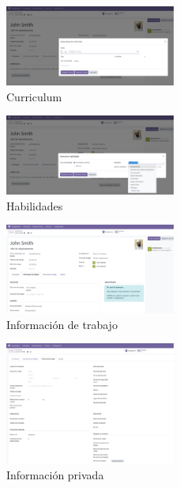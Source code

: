 \documentclass[a4paper,12pt]{article}
\begin{document}
\begin{figure}[h!]
    \centering
    \includegraphics[width=0.5\textwidth]{pr2odoo13-curriculum.png}
    \caption{Curriculum}
\end{figure}
\FloatBarrier

\begin{figure}[h!]
    \centering
    \includegraphics[width=0.5\textwidth]{pr2odoo14-habilidades.png}
    \caption{Habilidades}
\end{figure}
\FloatBarrier

\begin{figure}[h!]
    \centering
    \includegraphics[width=0.5\textwidth]{pr2odoo15-informacionDeTrabajo.png}
    \caption{Información de trabajo}
\end{figure}
\FloatBarrier

\begin{figure}[h!]
    \centering
    \includegraphics[width=0.5\textwidth]{pr2odoo16-informacionPrivada.png}
    \caption{Información privada}
\end{figure}
\FloatBarrier
\end{document}
